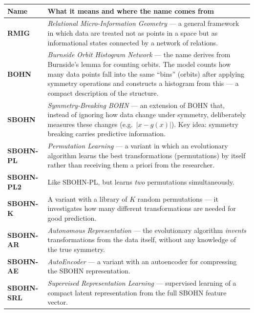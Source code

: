 \documentclass[11pt,a4paper]{report}
\begin{document}
\begin{center}
\renewcommand{\arraystretch}{1.4}
\begin{tabular}{lp{10cm}}
\toprule
\textbf{Name} & \textbf{What it means and where the name comes from} \\
\midrule

\textbf{RMIG} &
\emph{Relational Micro-Information Geometry} --- a general framework in which data are treated not as points in a space but as informational states connected by a network of relations. \\

\textbf{BOHN} &
\emph{Burnside Orbit Histogram Network} --- the name derives from Burnside's lemma for counting orbits. The model counts how many data points fall into the same ``bins'' (orbits) after applying symmetry operations and constructs a histogram from this --- a compact description of the structure. \\

\textbf{SBOHN} &
\emph{Symmetry-Breaking BOHN} --- an extension of BOHN that, instead of ignoring how data change under symmetry, deliberately measures these changes (e.g.\ $|x - g(x)|$). Key idea: symmetry breaking carries predictive information. \\

\textbf{SBOHN-PL} &
\emph{Permutation Learning} --- a variant in which an evolutionary algorithm learns the best transformations (permutations) by itself rather than receiving them a priori from the researcher. \\

\textbf{SBOHN-PL2} &
Like SBOHN-PL, but learns \emph{two} permutations simultaneously. \\

\textbf{SBOHN-K} &
A variant with a library of $K$ random permutations --- it investigates how many different transformations are needed for good prediction. \\

\textbf{SBOHN-AR} &
\emph{Autonomous Representation} --- the evolutionary algorithm \emph{invents} transformations from the data itself, without any knowledge of the true symmetry. \\

\textbf{SBOHN-AE} &
\emph{AutoEncoder} --- a variant with an autoencoder for compressing the SBOHN representation. \\

\textbf{SBOHN-SRL} &
\emph{Supervised Representation Learning} --- supervised learning of a compact latent representation from the full SBOHN feature vector. \\


\end{tabular}
\end{center}
\end{document}
